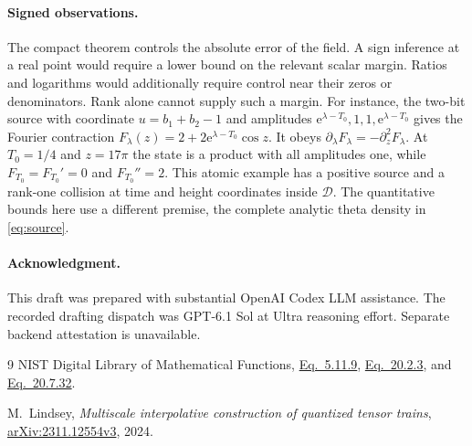 \documentclass[11pt]{article}
\newcommand{\e}{\mathrm e}
\newcommand{\boxD}{\mathcal D}
\begin{document}
\paragraph{Signed observations.}
The compact theorem controls the absolute error of the field.
A sign inference at a real point would require a lower bound on
the relevant scalar margin. Ratios and logarithms would additionally
require control near their zeros or denominators. Rank alone
cannot supply such a margin. For instance, the two-bit source with
coordinate \(u=b_1+b_2-1\) and amplitudes
\(\e^{\lambda-T_0},1,1,\e^{\lambda-T_0}\) gives the Fourier
contraction \(F_\lambda(z)=2+2\e^{\lambda-T_0}\cos z\).
It obeys \(\partial_\lambda F_\lambda=-\partial_z^2F_\lambda\).
At \(T_0=1/4\) and \(z=17\pi\) the state is a product with all
amplitudes one, while \(F_{T_0}=F_{T_0}'=0\) and \(F_{T_0}''=2\).
This atomic example has a positive source and a rank-one collision
at time and height coordinates inside \(\boxD\). The quantitative
bounds here use a different premise, the complete analytic theta
density in \eqref{eq:source}.

\paragraph{Acknowledgment.}
This draft was prepared with substantial OpenAI Codex LLM assistance.
The recorded drafting dispatch was GPT-6.1 Sol at Ultra reasoning effort.
Separate backend attestation is unavailable.

\begin{thebibliography}{9}
NIST Digital Library of Mathematical Functions,
\href{https://dlmf.nist.gov/5.11.E9}{Eq.~5.11.9},
\href{https://dlmf.nist.gov/20.2.E3}{Eq.~20.2.3}, and
\href{https://dlmf.nist.gov/20.7.E32}{Eq.~20.7.32}.

M.~Lindsey, \emph{Multiscale interpolative construction of quantized
tensor trains}, \href{https://arxiv.org/html/2311.12554v3}
{arXiv:2311.12554v3}, 2024.
\end{thebibliography}
\end{document}
